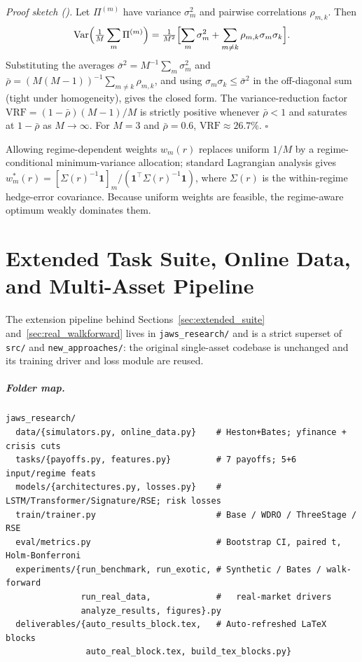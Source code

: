 \documentclass[11pt,oneside]{report}
\begin{document}
\smallskip
\noindent\textit{Proof sketch (\citealp{dietterich2000ensemble}).}  Let $\Pi^{(m)}$ have variance $\sigma_m^2$ and pairwise correlations $\rho_{m,k}$.  Then
\[
\mathrm{Var}\Bigl(\tfrac{1}{M}\sum_m \Pi^{(m)}\Bigr)
= \tfrac{1}{M^2}\Bigl[\sum_m \sigma_m^2 + \sum_{m\neq k}\rho_{m,k}\sigma_m\sigma_k\Bigr].
\]
Substituting the averages $\bar\sigma^2 = M^{-1}\sum_m\sigma_m^2$ and $\bar\rho = (M(M-1))^{-1}\sum_{m\neq k}\rho_{m,k}$, and using $\sigma_m\sigma_k\le\bar\sigma^2$ in the off-diagonal sum (tight under homogeneity), gives the closed form. The variance-reduction factor $\mathrm{VRF}=(1-\bar\rho)(M-1)/M$ is strictly positive whenever $\bar\rho<1$ and saturates at $1-\bar\rho$ as $M\to\infty$.  For $M=3$ and $\bar\rho=0.6$, $\mathrm{VRF}\approx 26.7\%$. \hfill$\square$

Allowing regime-dependent weights $w_m(r)$ replaces uniform $1/M$ by a regime-conditional minimum-variance allocation; standard Lagrangian analysis gives $w_m^*(r) = [\Sigma(r)^{-1}\mathbf{1}]_m/(\mathbf{1}^\top\Sigma(r)^{-1}\mathbf{1})$, where $\Sigma(r)$ is the within-regime hedge-error covariance.  Because uniform weights are feasible, the regime-aware optimum weakly dominates them.

\chapter{Extended Task Suite, Online Data, and Multi-Asset Pipeline}
\label{app:exotic}

The extension pipeline behind Sections~\ref{sec:extended_suite} and~\ref{sec:real_walkforward} lives in \texttt{jaws\_research/} and is a strict superset of \texttt{src/} and \texttt{new\_approaches/}: the original single-asset codebase is unchanged and its training driver and loss module are reused.

\paragraph{Folder map.}
\begin{verbatim}
jaws_research/
  data/{simulators.py, online_data.py}    # Heston+Bates; yfinance + crisis cuts
  tasks/{payoffs.py, features.py}         # 7 payoffs; 5+6 input/regime feats
  models/{architectures.py, losses.py}    # LSTM/Transformer/Signature/RSE; risk losses
  train/trainer.py                        # Base / WDRO / ThreeStage / RSE
  eval/metrics.py                         # Bootstrap CI, paired t, Holm-Bonferroni
  experiments/{run_benchmark, run_exotic, # Synthetic / Bates / walk-forward
               run_real_data,             #   real-market drivers
               analyze_results, figures}.py
  deliverables/{auto_results_block.tex,   # Auto-refreshed LaTeX blocks
                auto_real_block.tex, build_tex_blocks.py}
\end{verbatim}
\end{document}
